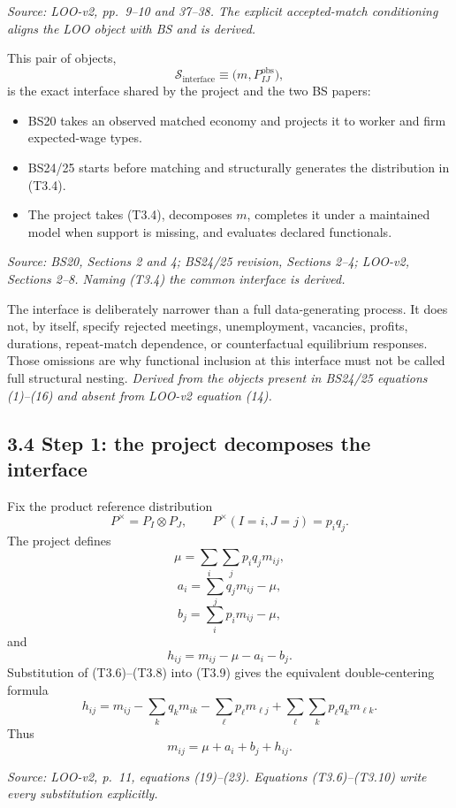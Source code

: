 \documentclass[11pt]{article}
\begin{document}
\textit{Source: LOO-v2, pp.\ 9--10 and 37--38.  The explicit
accepted-match conditioning aligns the LOO object with BS and is derived.}

This pair of objects,
\[
\mathcal S_{\mathrm{interface}}
\equiv
\bigl(m,P^{\mathrm{obs}}_{IJ}\bigr),
\tag{T3.4}
\]
is the exact interface shared by the project and the two BS papers:

\begin{itemize}
\item BS20 takes an observed matched economy and projects it to worker and firm
  expected-wage types.
\item BS24/25 starts before matching and structurally generates the
  distribution in (T3.4).
\item The project takes (T3.4), decomposes \(m\), completes it under a
  maintained model when support is missing, and evaluates declared
  functionals.
\end{itemize}

\textit{Source: BS20, Sections 2 and 4; BS24/25 revision, Sections 2--4;
LOO-v2, Sections 2--8.  Naming (T3.4) the common interface is derived.}

The interface is deliberately narrower than a full data-generating process.
It does not, by itself, specify rejected meetings, unemployment, vacancies,
profits, durations, repeat-match dependence, or counterfactual equilibrium
responses.  Those omissions are why functional inclusion at this interface
must not be called full structural nesting.
\textit{Derived from the objects present in BS24/25 equations (1)--(16) and
absent from LOO-v2 equation (14).}

\subsection{3.4 Step 1: the project decomposes the interface}

Fix the product reference distribution
\[
P^\times=P_I\otimes P_J,
\qquad
P^\times(I=i,J=j)=p_iq_j.
\tag{T3.5}
\]
The project defines
\[
\mu=\sum_i\sum_jp_iq_jm_{ij},
\tag{T3.6}
\]
\[
a_i=\sum_jq_jm_{ij}-\mu,
\tag{T3.7}
\]
\[
b_j=\sum_ip_im_{ij}-\mu,
\tag{T3.8}
\]
and
\[
h_{ij}=m_{ij}-\mu-a_i-b_j.
\tag{T3.9}
\]
Substitution of (T3.6)--(T3.8) into (T3.9) gives the equivalent double-centering
formula
\[
h_{ij}
=
m_{ij}
-\sum_kq_km_{ik}
-\sum_\ell p_\ell m_{\ell j}
+\sum_\ell\sum_kp_\ell q_km_{\ell k}.
\tag{T3.10}
\]
Thus
\[
m_{ij}=\mu+a_i+b_j+h_{ij}.
\tag{T3.11}
\]

\textit{Source: LOO-v2, p.\ 11, equations (19)--(23).  Equations
(T3.6)--(T3.10) write every substitution explicitly.}
\end{document}
